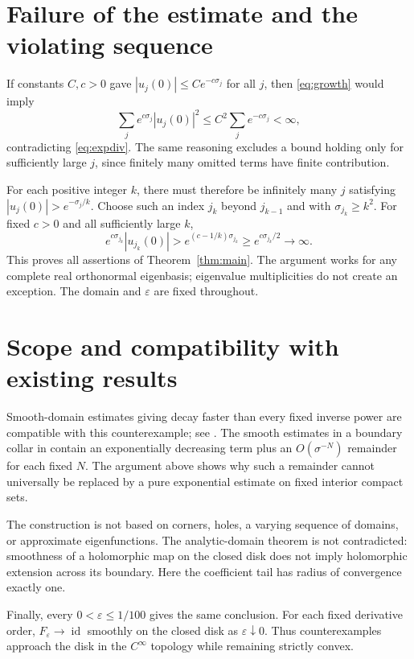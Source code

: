 \documentclass[11pt]{article}
\theoremstyle{remark}
\newcommand{\eps}{\varepsilon}
\begin{document}
\section{Failure of the estimate and the violating sequence}
If constants $C,c>0$ gave $|u_j(0)|\leq C e^{-c\sigma_j}$ for all $j$, then \eqref{eq:growth} would imply
\[
 \sum_j e^{c\sigma_j}|u_j(0)|^2
 \leq C^2\sum_j e^{-c\sigma_j}<\infty,
\]
contradicting \eqref{eq:expdiv}. The same reasoning excludes a bound holding only for sufficiently large $j$, since finitely many omitted terms have finite contribution.

For each positive integer $k$, there must therefore be infinitely many $j$ satisfying
$|u_j(0)|>e^{-\sigma_j/k}$. Choose such an index $j_k$ beyond $j_{k-1}$ and with $\sigma_{j_k}\geq k^2$. For fixed $c>0$ and all sufficiently large $k$,
\[
 e^{c\sigma_{j_k}}|u_{j_k}(0)|
 >e^{(c-1/k)\sigma_{j_k}}
 \geq e^{c\sigma_{j_k}/2}\longrightarrow\infty.
\]
This proves all assertions of Theorem~\ref{thm:main}. The argument works for any complete real orthonormal eigenbasis; eigenvalue multiplicities do not create an exception. The domain and $\eps$ are fixed throughout.

\section{Scope and compatibility with existing results}
Smooth-domain estimates giving decay faster than every fixed inverse power are compatible with this counterexample; see \cite[Theorem 10.1 and Remark 10.2]{survey}. The smooth estimates in a boundary collar in \cite[Corollary 2]{WZ} contain an exponentially decreasing term plus an $O(\sigma^{-N})$ remainder for each fixed $N$. The argument above shows why such a remainder cannot universally be replaced by a pure exponential estimate on fixed interior compact sets.

The construction is not based on corners, holes, a varying sequence of domains, or approximate eigenfunctions. The analytic-domain theorem \cite{GT} is not contradicted: smoothness of a holomorphic map on the closed disk does not imply holomorphic extension across its boundary. Here the coefficient tail has radius of convergence exactly one.

Finally, every $0<\eps\leq1/100$ gives the same conclusion. For each fixed derivative order, $F_\eps\to\operatorname{id}$ smoothly on the closed disk as $\eps\downarrow0$. Thus counterexamples approach the disk in the $C^\infty$ topology while remaining strictly convex.
\end{document}
